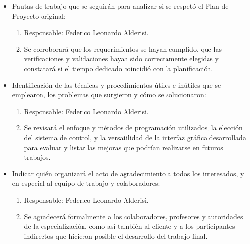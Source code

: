 \documentclass[
11pt, %
]{charter}
\begin{document}
\begin{itemize}
	\item Pautas de trabajo que se seguirán para analizar si se respetó el Plan de Proyecto original:
		\begin{enumerate}
		\item Responsable: Federico Leonardo Alderisi.
		\item Se corroborará que los requerimientos se hayan cumplido, que las verificaciones y validaciones hayan sido correctamente elegidas y constatará si el tiempo dedicado coincidió con la planificación.
		\end{enumerate}		 
	\item Identificación de las técnicas y procedimientos útiles e inútiles que se emplearon, los problemas que surgieron y cómo se solucionaron:
		\begin{enumerate}
		\item Responsable: Federico Leonardo Alderisi.
		\item Se revisará el enfoque y métodos de programación utilizados, la elección del sistema de control, y la versatilidad de la interfaz gráfica desarrollada para evaluar y listar las mejoras que podrían realizarse en futuros trabajos.
		\end{enumerate}	
	\item Indicar quién organizará el acto de agradecimiento a todos los interesados, y en especial al equipo de trabajo y colaboradores:
		\begin{enumerate}
		\item Responsable: Federico Leonardo Alderisi.
		\item Se agradecerá formalmente a los colaboradores, profesores y autoridades de la especialización, como así también al cliente y a los participantes indirectos que hicieron posible el desarrollo del trabajo final.
		\end{enumerate}	
\end{itemize}	  
	  
\end{document}
